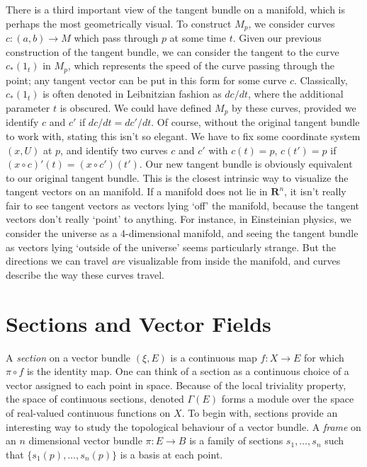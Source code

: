 There is a third important view of the tangent bundle on a manifold, which is perhaps the most geometrically visual. To construct $M_p$, we consider curves $c: (a,b) \to M$ which pass through $p$ at some time $t$. Given our previous construction of the tangent bundle, we can consider the tangent to the curve $c_*(1_t)$ in $M_p$, which represents the speed of the curve passing through the point; any tangent vector can be put in this form for some curve $c$. Classically, $c_*(1_t)$ is often denoted in Leibnitzian fashion as $dc/dt$, where the additional parameter $t$ is obscured. We could have defined $M_p$ by these curves, provided we identify $c$ and $c'$ if $dc/dt = dc'/dt$. Of course, without the original tangent bundle to work with, stating this isn't so elegant. We have to fix some coordinate system $(x,U)$ at $p$, and identify two curves $c$ and $c'$ with $c(t) = p$, $c(t') = p$ if $(x \circ c)'(t) = (x \circ c')(t')$. Our new tangent bundle is obviously equivalent to our original tangent bundle. This is the closest intrinsic way to visualize the tangent vectors on an manifold. If a manifold does not lie in $\mathbf{R}^n$, it isn't really fair to see tangent vectors as vectors lying `off' the manifold, because the tangent vectors don't really `point' to anything. For instance, in Einsteinian physics, we consider the universe as a 4-dimensional manifold, and seeing the tangent bundle as vectors lying `outside of the universe' seems particularly strange. But the directions we can travel {\it are} visualizable from inside the manifold, and curves describe the way these curves travel.

\section{Sections and Vector Fields}

A \emph{section} on a vector bundle $(\xi,E)$ is a continuous map $f:X \to E$ for which $\pi \circ f$ is the identity map. One can think of a section as a continuous choice of a vector assigned to each point in space. Because of the local triviality property, the space of continuous sections, denoted $\Gamma(E)$ forms a module over the space of real-valued continuous functions on $X$. To begin with, sections provide an interesting way to study the topological behaviour of a vector bundle. A \emph{frame} on an $n$ dimensional vector bundle $\pi: E \to B$ is a family of sections $s_1, \dots, s_n$ such that $\{ s_1(p), \dots, s_n(p) \}$ is a basis at each point.

